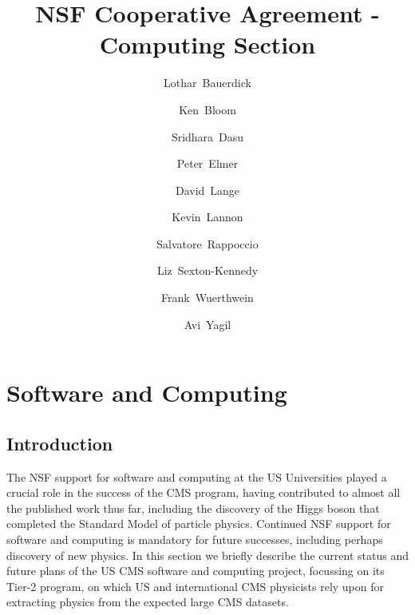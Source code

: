 \documentclass[11pt,a4paper]{article}
\begin{document}
\title{NSF Cooperative Agreement - Computing Section}

\author[1]{Lothar~Bauerdick}

\author[2]{Ken~Bloom}

\author[3]{Sridhara~Dasu}

\author[4]{Peter~Elmer}

\author[5]{David~Lange}

\author[6]{Kevin~Lannon}

\author[7]{Salvatore~Rappoccio}

\author[1]{Liz~Sexton-Kennedy}

\author[8]{Frank~Wuerthwein}

\author[8]{Avi~Yagil}


\renewcommand\Authands{ and }

\maketitle

\newpage

\section{Software and Computing}

\subsection{Introduction}

The NSF support for software and computing at the US Universities
played a crucial role in the success of the CMS program, having
contributed to almost all the published work thus far, including the
discovery of the Higgs boson that completed the Standard Model of
particle physics.  Continued NSF support for software and computing is
mandatory for future successes, including perhaps discovery of new
physics.  In this section we briefly describe the current status and
future plans of the US CMS software and computing project, focussing on
its Tier-2 program, on which US and international CMS physicists rely
upon for extracting physics from the expected large CMS datasets.
\end{document}
